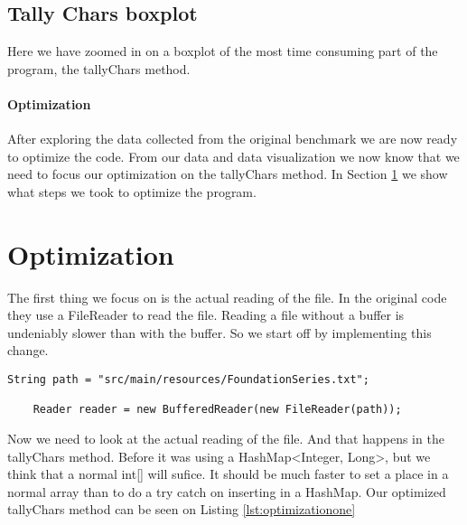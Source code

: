 \documentclass{article}
\begin{document}
\subsection*{Tally Chars boxplot}
Here we have zoomed in on a boxplot of the most time consuming part of the program, the tallyChars method. 


\paragraph{Optimization}
After exploring the data collected from the original benchmark we are now ready to optimize the code. 
From our data and data visualization we now know that we need to focus our optimization on the tallyChars method.
In Section \ref{optimization} we show what steps we took to optimize the program.

\section{Optimization} \label{optimization}
The first thing we focus on is the actual reading of the file. In the original code they use a FileReader to read the file.
Reading a file without a buffer is undeniably slower than with the buffer. So we start off by implementing this change. 

\begin{lstlisting}[caption={Change to BufferedReader}, label={lst:optimizationone}]
    String path = "src/main/resources/FoundationSeries.txt";

    Reader reader = new BufferedReader(new FileReader(path));
\end{lstlisting} 

Now we need to look at the actual reading of the file. And that happens in the tallyChars method. Before it was using 
a HashMap\textless Integer, Long\textgreater  , but we think that a normal int[] will sufice. It should be much faster 
to set a place in a normal array than to do a try catch on inserting in a HashMap.
Our optimized tallyChars method can be seen on Listing \ref{lst:optimizationone}
\end{document}
